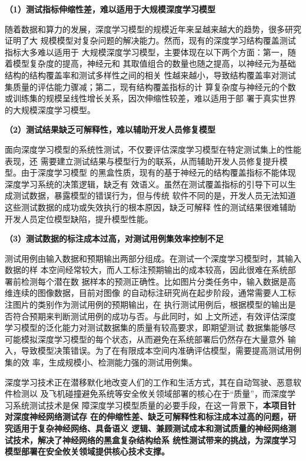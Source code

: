 \textbf{（1）测试指标伸缩性差，难以适用于大规模深度学习模型}

随着数据和算力的发展，深度学习模型的规模近年来呈越来越大的趋势，很多研究证明了大
规模模型对复杂问题的解决能力。然而，现有的深度学习结构覆盖测试指标大多难以适用于
大规模深度学习模型，主要体现在以下两个方面：第一，随着模型复杂度的提高，神经元和
其取值组合的数量也随之提高，以神经元为基础结构的结构覆盖率和测试多样性之间的相关
性越来越小，导致结构覆盖率对测试集质量的评估能力骤减；第二，现有结构覆盖指标的计
算复杂度与神经元的个数或训练集的规模呈线性增长关系，因次伸缩性较差，难以适用于部
署于真实世界的大规模深度学习模型。


\textbf{（2）测试结果缺乏可解释性，难以辅助开发人员修复模型}

面向深度学习模型的系统性测试，不仅要评估深度学习模型在特定测试集上的性能表现，还
需要建立测试结果与模型行为的联系，从而辅助开发人员修复提升模型。由于深度学习模型
的黑盒性质，现有的基于神经元的结构覆盖指标不能体现深度学习系统的决策逻辑，缺乏有
效语义。虽然在测试覆盖指标的引导下可以生成测试数据，暴露模型的错误行为，但与传统
软件不同的是，开发人员无法知道这些测试数据的成功或失效执行的根本原因，缺乏可解释
性的测试结果很难辅助开发人员定位模型缺陷，提升模型性能。

\textbf{（3）测试数据的标注成本过高，对测试用例集效率控制不足}

测试用例由输入数据和预期输出两部分组成。在测试一个深度学习模型时，其输入数据的样
本空间经常较大，而人工标注预期输出的成本较高，因此很难在系统部署前检测每个潜在数
据样本的预测正确性。比如图片分类任务中，输入数据是高维连续的图像数据，目前对图像
的自动标注研究尚在起步阶段，通常需要人工标注图片的类别作为测试用例的预期输出，在
执行测试用例后，根据模型的输出是否符合预期来判断测试用例的成功与否。与此同时，如
上文所述，有效评估深度学习模型的泛化能力对测试数据集的质量有较高要求，即期望测试
数据集能够尽可能模拟深度学习模型的每个状态，从而避免在系统部署后仍然存在大量意外
输入，导致模型决策错误。为了在有限成本空间内准确评估模型，需要提高测试用例集的效
率，生成规模小、检测能力强的测试用例集。


深度学习技术正在潜移默化地改变人们的工作和生活方式，其在自动驾驶、恶意软件检测以
及飞机碰撞避免系统等安全攸关领域部署的核心在于“质量”，而深度学习系统测试技术是保
障深度学习模型质量的必要手段，在这一背景下，\textbf{本项目针对深度神经网络测试存
在的伸缩性差、缺乏可解释性和标注成本过高的问题，研究适用于复杂神经网络、具备语义
逻辑、兼顾测试成本和测试质量的神经网络测试技术，解决了神经网络的黑盒复杂结构给系
统性测试带来的挑战，为深度学习模型部署在安全攸关领域提供核心技术支撑。}


